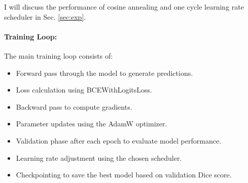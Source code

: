 \documentclass[twocolumn,a4paper]{article}
\begin{document}
I will discuss the performance of cosine annealing and one cycle learning rate scheduler in Sec. \ref{sec:exp}.

\paragraph{Training Loop:}
The main training loop consists of:
\begin{itemize}
    \item Forward pass through the model to generate predictions.
    \item Loss calculation using BCEWithLogitsLoss.
    \item Backward pass to compute gradients.
    \item Parameter updates using the AdamW optimizer.
    \item Validation phase after each epoch to evaluate model performance.
    \item Learning rate adjustment using the chosen scheduler.
    \item Checkpointing to save the best model based on validation Dice score.
\end{itemize}
\end{document}
